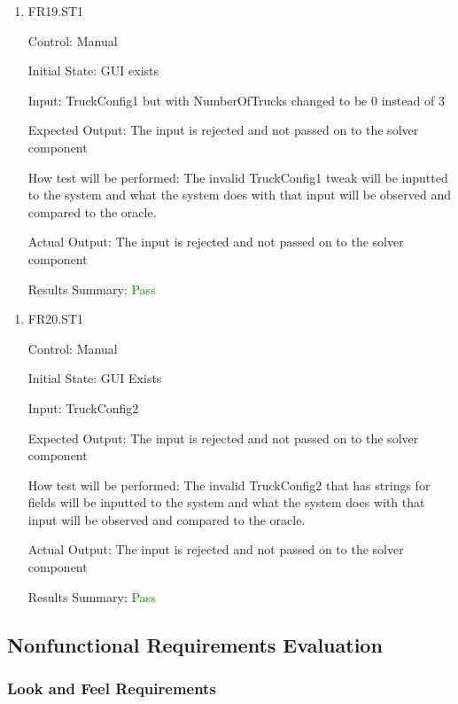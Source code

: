 \documentclass[12pt, titlepage]{article}
\begin{document}
\begin{enumerate}

  \item{FR19.ST1\\}
  
  Control: Manual
            
  Initial State: GUI exists
            
  Input: TruckConfig1 but with NumberOfTrucks changed to be 0 instead of 3
            
  Expected Output: The input is rejected and not passed on to the solver component
  
  How test will be performed: The invalid TruckConfig1 tweak will be inputted to the system and what the system does with that input will be observed and compared to the oracle.

  Actual Output: The input is rejected and not passed on to the solver component

  Results Summary: \textcolor{green} {Pass}
                
\end{enumerate}
\begin{enumerate}

  \item{FR20.ST1\\}
  
  Control: Manual
            
  Initial State: GUI Exists
            
  Input: TruckConfig2
            
  Expected Output: The input is rejected and not passed on to the solver component
  
  How test will be performed: The invalid TruckConfig2 that has strings for fields will be inputted to the system and what the system does with that input will be observed and compared to the oracle.

  Actual Output: The input is rejected and not passed on to the solver component

  Results Summary: \textcolor{green} {Pass}
\end{enumerate}   
\subsection{Nonfunctional Requirements Evaluation}

\subsubsection{Look and Feel Requirements}
\end{document}
